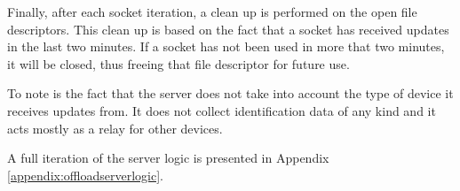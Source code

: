 Finally, after each socket iteration, a clean up is performed on the open file descriptors. This clean up is based on the fact that a socket has received updates in the last two minutes. If a socket has not been used in more that two minutes, it will be closed, thus freeing that file descriptor for future use.

To note is the fact that the server does not take into account the type of device it receives updates from. It does not collect identification data of any kind and it acts mostly as a relay for other devices.

A full iteration of the server logic is presented in Appendix \ref{appendix:offloadserverlogic}.







